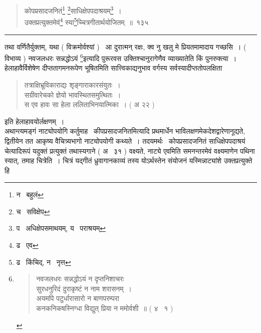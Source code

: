 \documentclass[11pt, openany]{book}
\begin{document}
\newpage

\begin{quote}
{\na कोपप्रसादजनितं\renewcommand{\thefootnote}{1}\footnote{न \textendash\ बहुलं} \renewcommand{\thefootnote}{2}\footnote{च \textendash\ सविक्षेप}साधिक्षेपपदाश्रयम्\renewcommand{\thefootnote}{3}\footnote{प \textendash\ अधिक्षेपसमाथयम्, य \textendash\ पराश्रयम्}~।\\
उक्तप्रत्युक्तमेवं\renewcommand{\thefootnote}{4}\footnote{ढ \textendash\ एव} स्या\renewcommand{\thefootnote}{5}\footnote{ढ \textendash\ किंचिद्, न \textendash\ नृत्त}च्चित्रगीतार्थयोजितम्~॥~१३५}
\end{quote}

\hrule

\vspace{2mm}
\noindent
तथा वर्णितैर्युक्तम्, यथा ( विक्रमोर्वश्यां ) \textendash\ {\qt आ दुरात्मन् रक्षः, क्व नु खलु मे प्रियतमामादाय गच्छसि~। ( विभाव्य ) नवजलधरः सन्नद्धोऽयं} \renewcommand{\thefootnote}{*}\footnote{\begin{quote}
{\qt नवजलधरः सन्नद्धोऽयं न दृप्तनिशाचरः\\
सुरधनुरिदं दुराकृष्टं न नाम शरासनम्~।\\
अयमपि पटुर्धारासारो न बाणपरम्परा\\
कनकनिकषस्निग्धा विद्युत् प्रिया न ममोर्वशी~॥} ( ४ \textendash\ १ )
\end{quote}}इत्यादि पुरूरवस उक्तिश्चानुरागेणैव व्याख्यातेति किं पुनरुक्त्या~।\\

हेलाहावैर्विशेषेण दीप्ततागमनरूपेण भूषितमिति सात्त्विकाद्यनुभाव वर्गस्य सर्वस्यादीप्ततोपलक्षिता \textendash

\begin{quote}
{\qt तत्राक्षिभ्रूविकाराद्यः शृङ्गाराकारसंयुतः~।\\
सग्रीवारेचको ज्ञेयो भावस्थितसमुत्थितः~।\\
स एव हावः सा हेला ललिताभिनयात्मिका~। ( अ २२ )}
\end{quote}

\noindent
इति हेलाहावयोर्लक्षणम्~।\\

अथान्त्यमङ्गं नाट्योपयोगि कर्तुमाह \textendash\ कीपप्रसादजनितमित्यादि प्रथमार्धेन भाविलक्षणमेकदेशद्वारेणानूद्यते, द्वितीयेन तत आकृष्य वैचित्र्यभागो नाट्योपयोगी कथ्यते~। तदयमर्थः \textendash\ कोपप्रसादजनितं साधिक्षेपपदाश्रयं चेत्यादिरूपं यदुक्तं प्रत्युक्तं तथास्यगाने ( अ \textendash\ ३१ ) वक्ष्यते, नाट्ये एवमिति समनन्तरमेवं वक्ष्यमाणेन पथिना स्यात्, तमाह चित्रेति~। चित्रं यद्गीतं ध्रुवागानकाव्यं तस्य योऽर्थस्तेन संयोजनं यस्मिन्नाट्यांशे उक्तप्रत्युक्ते हि
\end{document}
